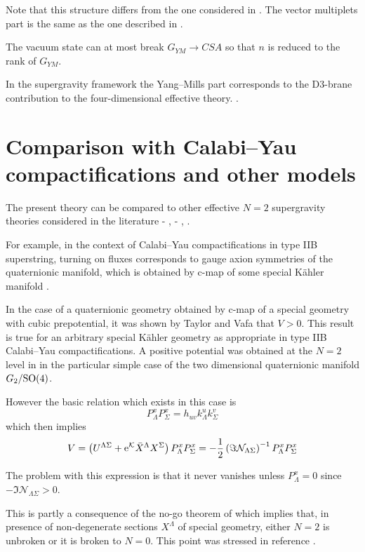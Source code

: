 \documentclass[a4paper,12pt]{article}
\begin{document}
Note that this structure differs from the one considered in \cite{fgpt}. The vector multiplets part is the same as the one 
described in \cite{zino}.

The vacuum state can at most break $G_{YM} \to CSA$ so that $n$ is reduced to the rank of $G_{YM}$.

In the supergravity framework the Yang--Mills part corresponds to the D3-brane contribution
to the four-dimensional effective theory. \cite{fp1,kst,grana,fm}.

\section{Comparison with Calabi--Yau compactifications and other models}

The present theory can be compared to other effective 
$N=2$ supergravity theories  considered in the literature \cite{tv} - \cite{louis}, \cite{lm} - \cite{hl}, \cite{bbhl,agata,bd}.

For example, in the context of Calabi--Yau compactifications in type IIB superstring, turning on fluxes corresponds 
to gauge axion symmetries of the quaternionic manifold, which is obtained by c-map \cite{cfg} of  
some special K\"ahler manifold \cite{mic,agata}.

In the case of a quaternionic geometry obtained by c-map of a special geometry with cubic prepotential,
 it was shown by Taylor and Vafa \cite{tv} that $V>0$.
This result is true for an arbitrary special K\"ahler geometry
as appropriate in type IIB Calabi--Yau compactifications.
A positive potential was obtained at the $N=2$ level in \cite{agata}
in the particular simple case of the two dimensional quaternionic manifold $G_2 /\mathrm{SO}(4)$.

However the basic relation which exists in this case is \cite{agata}
\begin{equation}
P^x_\Lambda P^x_\Sigma = h_{uv} k^u_\Lambda k^v_\Sigma
\end{equation}
which then implies
\begin{equation}
V = \left(U^{\Lambda \Sigma} + {\rm e}^{\mathcal K}\bar X^\Lambda  X^\Sigma\right)P^x_\Lambda P^x_\Sigma = -\frac 12 \left(
\Im {\mathcal N}_{\Lambda\Sigma}\right)^{-1} P^x_\Lambda P^x_\Sigma
\end{equation}

The problem with this expression is that it never vanishes unless $P^x_\Lambda =0$ since $-\Im {\mathcal N}_{\Lambda\Sigma}>0$.

This is partly a consequence of the no-go theorem of \cite{cgp2} which implies that, in presence of non-degenerate sections $X^\Lambda$ of
special geometry, either $N=2$ is unbroken or it is broken to $N=0$. This point was stressed in reference \cite{mayr}.
\end{document}

